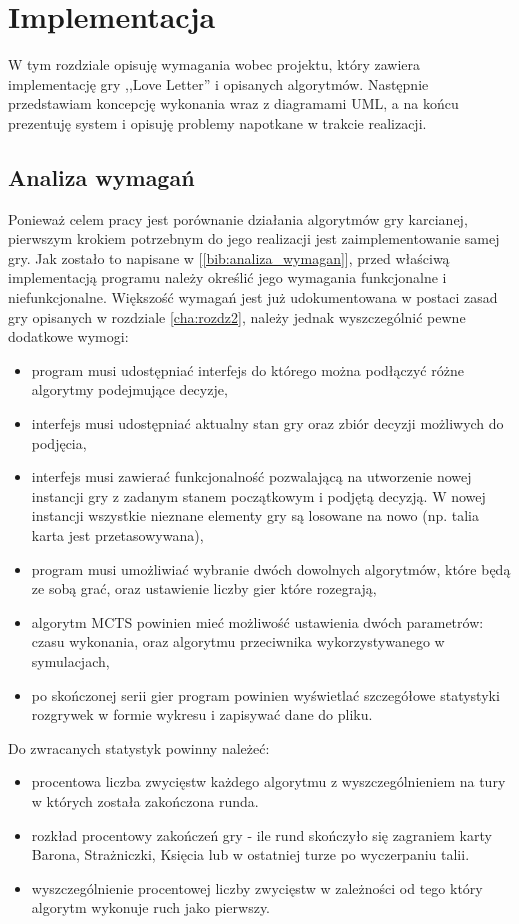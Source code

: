 \chapter{Implementacja}
\label{cha:rozdz4}

W tym rozdziale opisuję wymagania wobec projektu, który zawiera implementację gry ,,Love Letter'' i opisanych algorytmów. Następnie przedstawiam koncepcję wykonania wraz z diagramami UML, a na końcu prezentuję system i opisuję problemy napotkane w trakcie realizacji.

\section{Analiza wymagań}
Ponieważ celem pracy jest porównanie działania algorytmów gry karcianej, pierwszym krokiem potrzebnym do jego realizacji jest zaimplementowanie samej gry. Jak zostało to napisane w [\ref{bib:analiza_wymagan}], przed właściwą implementacją programu należy określić jego wymagania funkcjonalne i niefunkcjonalne. Większość wymagań jest już udokumentowana w postaci zasad gry opisanych w rozdziale \ref{cha:rozdz2}, należy jednak wyszczególnić pewne dodatkowe wymogi:
\begin{itemize}
	\item program musi udostępniać interfejs do którego można podłączyć różne algorytmy podejmujące decyzje,
	\item interfejs musi udostępniać aktualny stan gry oraz zbiór decyzji możliwych do podjęcia,
	\item interfejs musi zawierać funkcjonalność pozwalającą na utworzenie nowej instancji gry z zadanym stanem początkowym i podjętą decyzją. W nowej instancji wszystkie nieznane elementy gry są losowane na nowo (np. talia karta jest przetasowywana),
	\item program musi umożliwiać wybranie dwóch dowolnych algorytmów, które będą ze sobą grać, oraz ustawienie liczby gier które rozegrają,
	\item algorytm MCTS powinien mieć możliwość ustawienia dwóch parametrów: czasu wykonania, oraz algorytmu przeciwnika wykorzystywanego w symulacjach,
	\item po skończonej serii gier program powinien wyświetlać szczegółowe statystyki rozgrywek w formie wykresu i zapisywać dane do pliku.
\end{itemize}
Do zwracanych statystyk powinny należeć:
\begin{itemize}
	\item procentowa liczba zwycięstw każdego algorytmu z wyszczególnieniem na tury w których została zakończona runda.
	\item rozkład procentowy zakończeń gry - ile rund skończyło się zagraniem karty Barona, Strażniczki, Księcia lub w ostatniej turze po wyczerpaniu talii.
	\item wyszczególnienie procentowej liczby zwycięstw w zależności od tego który algorytm wykonuje ruch jako pierwszy.
\end{itemize}

